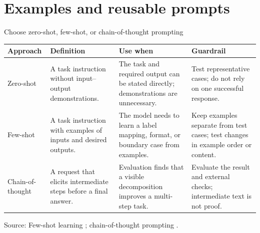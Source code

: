 \documentclass[aspectratio=169]{beamer}
\newcommand{\slidesource}[1]{\vfill{\raggedright\tiny\color{hrgray}Source: #1\par}}
\begin{document}
\section{Examples and reusable prompts}
\begin{frame}{Choose zero-shot, few-shot, or chain-of-thought prompting}
\small
\begin{center}\footnotesize\begin{tabular}{@{}>{\raggedright\arraybackslash}p{.15\linewidth}>{\raggedright\arraybackslash}p{.23\linewidth}>{\raggedright\arraybackslash}p{.27\linewidth}>{\raggedright\arraybackslash}p{.25\linewidth}@{}}
\toprule
Approach & Definition & Use when & Guardrail\\ \midrule
Zero-shot & A task instruction without input--output demonstrations. & The task and required output can be stated directly; demonstrations are unnecessary. & Test representative cases; do not rely on one successful response.\\
Few-shot & A task instruction with examples of inputs and desired outputs. & The model needs to learn a label mapping, format, or boundary case from examples. & Keep examples separate from test cases; test changes in example order or content.\\
Chain-of-thought & A request that elicits intermediate steps before a final answer. & Evaluation finds that a visible decomposition improves a multi-step task. & Evaluate the result and external checks; intermediate text is not proof.\\ \bottomrule
\end{tabular}\end{center}
\slidesource{Few-shot learning \parencite{Brown2020LanguageModelsFew}; chain-of-thought prompting \parencite{Wei2022ChainThoughtPrompting}.}
\end{frame}
\end{document}
